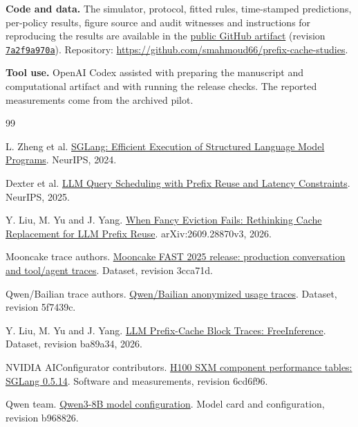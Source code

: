 \documentclass[11pt,letterpaper]{article}
\begin{document}
\noindent\textbf{Code and data.} The simulator, protocol, fitted rules, time-stamped predictions, per-policy results, figure source and audit witnesses and instructions for reproducing the results are available in the \href{https://github.com/smahmoud66/prefix-cache-studies/blob/7a2f9a970a0bb851a5517bf48c3c95dd73cb538b/docs/ordering.md}{public GitHub artifact} (revision \href{https://github.com/smahmoud66/prefix-cache-studies/commit/7a2f9a970a0bb851a5517bf48c3c95dd73cb538b}{\texttt{7a2f9a970a}}). Repository: \url{https://github.com/smahmoud66/prefix-cache-studies}.

\noindent\textbf{Tool use.} OpenAI Codex assisted with preparing the manuscript and computational artifact and with running the release checks. The reported measurements come from the archived pilot.

\begin{thebibliography}{99}

 L. Zheng et al. \href{https://proceedings.nips.cc/paper_files/paper/2024/hash/724be4472168f31ba1c9ac630f15dec8-Abstract-Conference.html}{SGLang: Efficient Execution of Structured Language Model Programs}. NeurIPS, 2024.

 Dexter et al. \href{https://proceedings.neurips.cc/paper_files/paper/2025/hash/878bbdf6227315995c207561211ddb53-Abstract-Conference.html}{LLM Query Scheduling with Prefix Reuse and Latency Constraints}. NeurIPS, 2025.

 Y. Liu, M. Yu and J. Yang. \href{https://arxiv.org/abs/2609.28870v3}{When Fancy Eviction Fails: Rethinking Cache Replacement for LLM Prefix Reuse}. arXiv:2609.28870v3, 2026.

 Mooncake trace authors. \href{https://github.com/kvcache-ai/Mooncake/tree/3cca71daccf2a7afb8fe3f0295358f70e3a69fdb/FAST25-release/traces}{Mooncake FAST 2025 release: production conversation and tool/agent traces}. Dataset, revision 3cca71d.

 Qwen/Bailian trace authors. \href{https://github.com/alibaba-edu/qwen-bailian-usagetraces-anon/tree/5f7439c51ec248a0c585f7d90a41a6f57773b912}{Qwen/Bailian anonymized usage traces}. Dataset, revision 5f7439c.

 Y. Liu, M. Yu and J. Yang. \href{https://huggingface.co/datasets/harvardMadsys/2026_prefixcache/tree/ba89a343a048073dda72617bb6087910da6214d0}{LLM Prefix-Cache Block Traces: FreeInference}. Dataset, revision ba89a34, 2026.

 NVIDIA AIConfigurator contributors. \href{https://github.com/ai-dynamo/aiconfigurator/tree/6cd6f9686ab7de6e8fb28171d6e350ee0aa4ed39/aic-core/src/aiconfigurator_core/systems/data/h100_sxm}{H100 SXM component performance tables: SGLang 0.5.14}. Software and measurements, revision 6cd6f96.

 Qwen team. \href{https://huggingface.co/Qwen/Qwen3-8B/blob/b968826d9c46dd6066d109eabc6255188de91218/config.json}{Qwen3-8B model configuration}. Model card and configuration, revision b968826.

\end{thebibliography}
\end{document}
